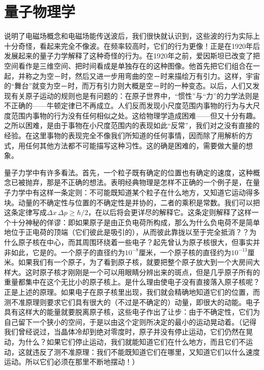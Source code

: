 \documentclass[12pt,oneside]{book}
\begin{document}
\section{量子物理学}
说明了电磁场概念和电磁场能传送波后，我们很快就认识到，这些波的行为实际上十分奇怪，看起来完全不像波。在频率较高时，它们的行为更像！正是在1920年后发展起来的量子力学解释了这种奇怪的行为。在1920年之前，爱因斯坦已改变了把空间看作是三维空间、把时间看成是单独存在的这种图像。他首先把它们组合在一起，并称之为空－时，然后又进一步用弯曲的空－时来描绘万有引力。这样，宇宙的“舞台”就变为空－时，而万有引力则大概是空－时的一种变态。以后，人们又发现有关原子运动的规则也是有问题的：在原子世界中，“惯性”与“力”的力学法则是不正确的——牛顿定律已不再成立。人们反而发现小尺度范围内事物的行为与大尺度范围内事物的行为没有任何相似之处。这给物理学造成困难——但又十分有趣。之所以困难，是由于事物在小尺度范围内的表现如此“反常”，我们对之没有直接的经验。在这里事物的表现完全不像我们所知道的任何事情，因而除了用解析的方式，用任何其他方法都不可能描写这种习性。这的确是困难的，需要做大量的想象。

量子力学中有许多看法。首先，一个粒子既有确定的位置也有确定的速度，这种概念已被抛弃，那是不正确的想法。表明经典物理是怎样不正确的一个例子是，在量子力学中有这样一条定则：不可能既知道某个粒子在什么地方，又知道它运动得多块。动量的不确定性与位置的不确定性是并协的，二者的乘积是常数。我们可以把这条定律写成$ \Delta x\,\Delta p\geq\hbar/2 $，在以后将会更详尽的解释它。这条定则解释了这样一个十分神秘的佯谬：即如果原子是由正负电荷所构成，那么为什么负电荷不是简单地位于正电荷的顶端（它们彼此是吸引的），从而彼此靠拢以至于完全抵消？？为什么原子核在中心，而其周围环绕着一些电子？起先曾认为原子核很大，但事实并非如此，它是的。一个原子的直径约为$ 10^{-8} $厘米，一个原子核的直径约为$ 10^{-13} $厘米。如果我们有一个原子，为了看到原子核，就要把整个原子放大到一个大房间大样大。这时原子核才刚刚是一个可以用眼睛分辨出来的斑点，但是几乎原子所有的重量都集中在这个无比小的原子核上。是什么理由使电子没有直接落入原子核呢？正是上述的原理。如果电子在原子核里出现，我们就会精确地知道它们的位置，而测不准原理则要求它们具有很大的（不过是不确定的）动量，即很大的动能。电子具有这样大的能量就要脱离原子核，这些电子作出了让步：由于不确定性，它们为自己留下一个狭小的空间，于是以由这个定则所决定的最小的运动晃动着。（记得我们曾经说过，当晶体冷却到绝对零度时，原子并没有停止运动，它们仍然在晃动，为什么？如果它们停止运动，我们就能知道它们在什么地方，而且它们不运动，这就违反了测不准原理：我们不能既知道它们在哪里，又知道它们以什么速度运动。所以它们必须在那里不断地摆动！）
\end{document}
